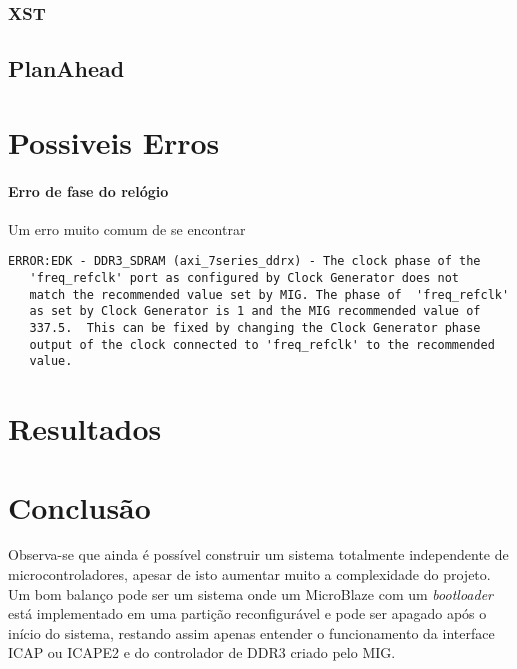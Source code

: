 \documentclass[11pt,a4paper,oneside]{book}
\begin{document}
\subsubsection{XST}

\subsection{PlanAhead}


\section{Possiveis Erros}
\paragraph{Erro de fase do relógio}
Um erro muito comum de se encontrar

\begin{lstlisting}
ERROR:EDK - DDR3_SDRAM (axi_7series_ddrx) - The clock phase of the
   'freq_refclk' port as configured by Clock Generator does not
   match the recommended value set by MIG. The phase of  'freq_refclk'
   as set by Clock Generator is 1 and the MIG recommended value of
   337.5.  This can be fixed by changing the Clock Generator phase
   output of the clock connected to 'freq_refclk' to the recommended
   value. 
\end{lstlisting}

\section{Resultados}

\section{Conclusão}

Observa-se que ainda é possível construir um sistema totalmente independente de microcontroladores, apesar de isto aumentar muito a complexidade do projeto.
Um bom balanço pode ser um sistema onde um MicroBlaze com um \textit{bootloader} está implementado em uma partição reconfigurável e pode ser apagado após o início do sistema, restando assim apenas entender o funcionamento da interface ICAP ou ICAPE2 e do controlador de DDR3 criado pelo MIG.

\ifx\compilewholereport\undefined
	 
	\newsavebox\mytempbib\savebox\mytempbib{\parbox{\textwidth}{}}

	\listoftodos
	
\end{document}
